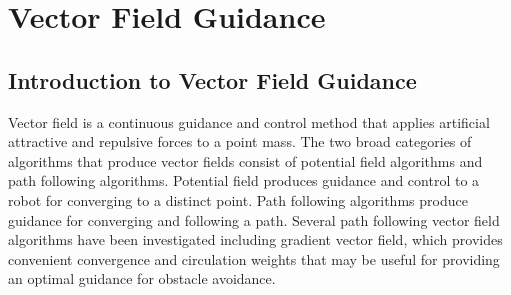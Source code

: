 \documentclass[numbered,pdftex]{ohio-etd}
\begin{document}
%	
%	
%		
%
%		




\section{Vector Field Guidance}

\subsection{Introduction to Vector Field Guidance}
Vector field is a continuous guidance and control method that applies artificial attractive and repulsive forces to a point mass. The two broad categories of algorithms that produce vector fields consist of potential field algorithms and path following algorithms. Potential field produces guidance and control to a robot for converging to a distinct point. Path following algorithms produce guidance for converging and following a path. Several path following vector field algorithms have been investigated including gradient vector field, which provides convenient convergence and circulation weights that may be useful for providing an optimal guidance for obstacle avoidance. 
\end{document}
